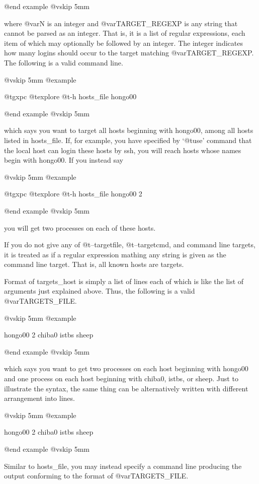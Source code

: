 @end example
@vskip 5mm

where @var{N} is an integer and @var{TARGET_REGEXP} is any string that cannot
be parsed as an integer. That is, it is a list of regular
expressions, each item of which may optionally be followed by an
integer. The integer indicates how many logins should occur to
the target matching @var{TARGET_REGEXP}. The following is a valid
command line.

@vskip 5mm
@example

  @t{gxpc} @t{explore} @t{-h} hosts_file hongo00

@end example
@vskip 5mm

which says you want to target all hosts beginning with hongo00,
among all hosts listed in hosts_file.  If, for example, you have
specified by `@t{use}' command that the local host can login these
hosts by ssh, you will reach hosts whose names begin with
hongo00.  If you instead say

@vskip 5mm
@example

  @t{gxpc} @t{explore} @t{-h} hosts_file hongo00 2

@end example
@vskip 5mm

you will get two processes on each of these hosts.

If you do not give any of @t{--targetfile}, @t{--targetcmd}, and command
line targets, it is treated as if a regular expression mathing
any string is given as the command line target. That is, all
known hosts are targets.

Format of targets_host is simply a list of lines each of which
is like the list of arguments just explained above. Thus, the
following is a valid @var{TARGETS_FILE}.

@vskip 5mm
@example

  hongo00 2
  chiba0
  istbs
  sheep

@end example
@vskip 5mm

which says you want to get two processes on each host beginning
with hongo00 and one process on each host beginning with chiba0,
istbs, or sheep. Just to illustrate the syntax, the same thing
can be alternatively written with different arrangement into
lines.

@vskip 5mm
@example

  hongo00 2 chiba0
  istbs sheep

@end example
@vskip 5mm

Similar to hosts_file, you may instead specify a command line
producing the output conforming to the format of @var{TARGETS_FILE}.

